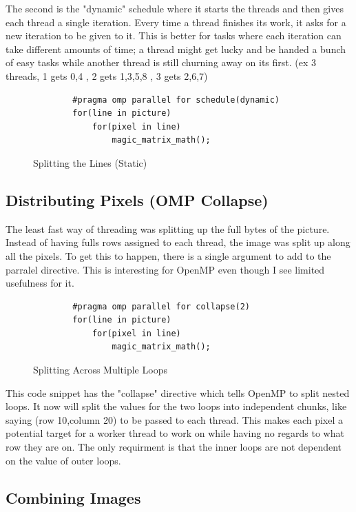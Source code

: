 \documentclass[12pt]{article}
\begin{document}
The second is the "dynamic" schedule where it starts the threads and then gives each thread a single iteration.
Every time a thread finishes its work, it asks for a new iteration to be given to it.
This is better for tasks where each iteration can take different amounts of time; a thread might get lucky and be handed a bunch of easy tasks while another thread is still churning away on its first.
(ex 3 threads, 1 gets 0,4 , 2 gets 1,3,5,8 , 3 gets 2,6,7)

\begin{figure}[htb]
	\centering
	\begin{verbatim}
		#pragma omp parallel for schedule(dynamic)
		for(line in picture)
			for(pixel in line)
				magic_matrix_math();
	\end{verbatim}
	\vspace{-16pt}
	\caption{Splitting the Lines (Static)}
\end{figure}

\subsection{Distributing Pixels (OMP Collapse)}

The least fast way of threading was splitting up the full bytes of the picture.
Instead of having fulls rows assigned to each thread, the image was split up along all the pixels.
To get this to happen, there is a single argument to add to the parralel directive.
This is interesting for OpenMP even though I see limited usefulness for it.

\begin{figure}[htb]
	\centering
	\begin{verbatim}
		#pragma omp parallel for collapse(2)
		for(line in picture)
			for(pixel in line)
				magic_matrix_math();
	\end{verbatim}
	\vspace{-16pt}
	\caption{Splitting Across Multiple Loops}
\end{figure}

This code snippet has the "collapse" directive which tells OpenMP to split nested loops.
It now will split the values for the two loops into independent chunks, like saying (row 10,column 20) to be passed to each thread.
This makes each pixel a potential target for a worker thread to work on while having no regards to what row they are on.
The only requirment is that the inner loops are not dependent on the value of outer loops.

\subsection{Combining Images}
\end{document}
